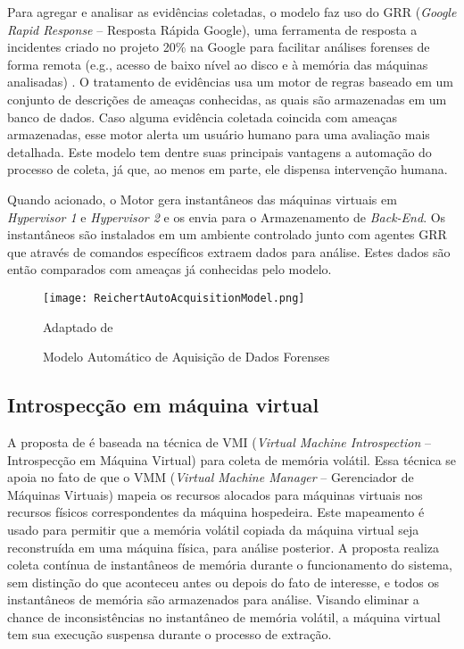 Para agregar e analisar as evidências coletadas, o modelo faz uso do GRR (\textit{Google Rapid Response} -- Resposta Rápida Google), uma ferramenta de resposta a incidentes criado no projeto 20\% na Google para facilitar análises forenses de forma remota (e.g., acesso de baixo nível ao disco e à memória das máquinas analisadas) \cite{GRRRapidResponse:2013}.
%
O tratamento de evidências usa um motor de regras baseado em um conjunto de descrições de ameaças conhecidas, as quais são armazenadas em um banco de dados.
%
Caso alguma evidência coletada coincida com ameaças armazenadas, esse motor alerta um usuário humano para uma avaliação mais detalhada.
%
Este modelo tem dentre suas principais vantagens a automação do processo de coleta, já que, ao menos em parte, ele dispensa intervenção humana. 


Quando acionado, o Motor gera instantâneos das máquinas virtuais em \textit{Hypervisor 1} e \textit{Hypervisor 2} e os envia para o Armazenamento de \textit{Back-End}.
%
Os instantâneos são instalados em um ambiente controlado junto com agentes GRR que através de comandos específicos extraem dados para análise. 
%
Estes dados são então comparados com ameaças já conhecidas pelo modelo.

\begin{figure}[htb!]
\footnotesize
\caption{Modelo Automático de Aquisição de Dados Forenses} %
\texttt{[image: ReichertAutoAcquisitionModel.png]}
\centering
\label{fig:ReichertAutoAcquisitionModel}
\begin{center}
Adaptado de \cite{ReichertAutoAcquisition:2015} 
\end{center}
\end{figure}


\subsection{Introspecção em máquina virtual}
\label{sec:VMI}

A proposta de \cite{PoiselVMI:2013} é baseada na técnica de VMI (\textit{Virtual Machine Introspection} -- Introspecção em Máquina Virtual) para coleta de memória volátil. 
%
Essa técnica se apoia no fato de que o VMM (\textit{Virtual Machine Manager} -- Gerenciador de Máquinas Virtuais) mapeia os recursos alocados para máquinas virtuais nos recursos físicos correspondentes da máquina hospedeira.
%
Este mapeamento é usado para permitir que a memória volátil copiada da máquina virtual seja reconstruída em uma máquina física, para análise posterior.
%
A proposta realiza coleta contínua de instantâneos de memória durante o funcionamento do sistema, sem distinção do que aconteceu antes ou depois do fato de interesse, e todos os instantâneos de memória são armazenados para análise.
%
Visando eliminar a chance de inconsistências no instantâneo de memória volátil, a máquina virtual tem sua execução suspensa durante o processo de extração.


